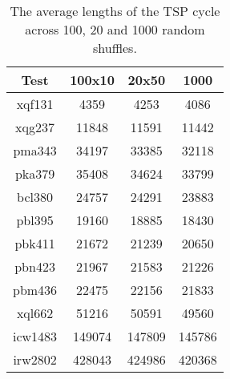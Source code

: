 \documentclass[a4paper, 12pt]{article}
\begin{document}
\begin{table}[h]
\centering
\begin{tabular}{@{}cccc@{}}
\toprule
Test    & 100x10 & 20x50  & 1000   \\ \midrule
xqf131  & 4359   & 4253   & 4086   \\ \midrule
xqg237  & 11848  & 11591  & 11442  \\ \midrule
pma343  & 34197  & 33385  & 32118  \\ \midrule
pka379  & 35408  & 34624  & 33799  \\ \midrule
bcl380  & 24757  & 24291  & 23883  \\ \midrule
pbl395  & 19160  & 18885  & 18430  \\ \midrule
pbk411  & 21672  & 21239  & 20650  \\ \midrule
pbn423  & 21967  & 21583  & 21226  \\ \midrule
pbm436  & 22475  & 22156  & 21833  \\ \midrule
xql662  & 51216  & 50591  & 49560  \\ \bottomrule
icw1483 & 149074 & 147809 & 145786 \\ \midrule
irw2802 & 428043 & 424986 & 420368 \\ \midrule
\end{tabular}
\caption{The average lengths of the TSP cycle across 100, 20 and 1000 random shuffles.}
\label{tab:random}
\end{table}
\end{document}
